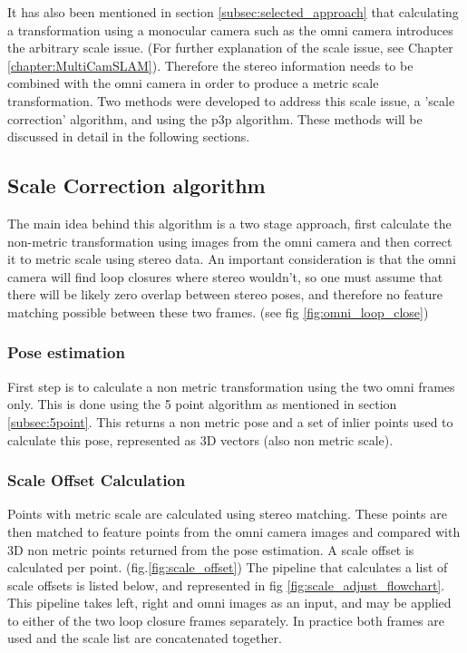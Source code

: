 It has also been mentioned in section \ref{subsec:selected_approach} that calculating a transformation using a monocular camera such as the omni camera introduces the arbitrary scale issue.  (For further explanation of the scale issue, see Chapter \ref{chapter:MultiCamSLAM}). Therefore the stereo information needs to be combined with the omni camera in order to produce a metric scale transformation.  Two methods were developed to address this scale issue, a 'scale correction' algorithm, and using the p3p algorithm.  These methods will be discussed in detail in the following sections.

\subsection{Scale Correction algorithm}

The main idea behind this algorithm is a two stage approach, first calculate the non-metric transformation using images from the omni camera and then correct it to metric scale using stereo data.  An important consideration is that the omni camera will find loop closures where stereo wouldn't, so one must assume that there will be likely zero overlap between stereo poses, and therefore no feature matching possible between these two frames. (see fig \ref{fig:omni_loop_close})

\subsubsection{Pose estimation}

First step is to calculate a non metric transformation using the two omni frames only.  This is done using the 5 point algorithm as mentioned in section \ref{subsec:5point}.  This returns a non metric pose and a set of inlier points used to calculate this pose, represented as 3D vectors (also non metric scale).

\subsubsection{Scale Offset Calculation}

Points with metric scale are calculated using stereo matching.  These points are then matched to feature points from the omni camera images and compared with 3D non metric points returned from the pose estimation.  A scale offset is calculated per point.  (fig.\ref{fig:scale_offset}) The pipeline that calculates a list of scale offsets is listed below, and represented in fig \ref{fig:scale_adjust_flowchart}.  This pipeline takes left, right and omni images as an input, and may be applied to either of the two loop closure frames separately.  In practice both frames are used and the scale list are concatenated together.

